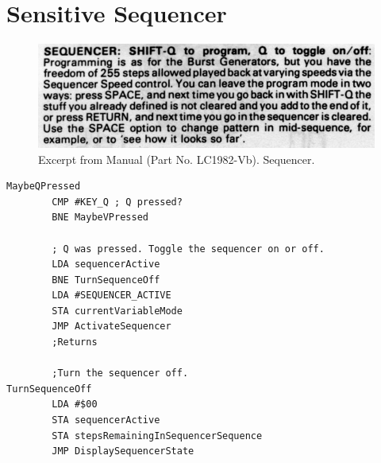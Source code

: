 \chapter{Sensitive Sequencer} 
\lstset{style=6502Style}

\begin{figure}[H]
    \centering
    \begin{adjustbox}{width=10.5cm,margin=0cm}
      \includegraphics[width=12cm]{src/sequencer/sequencer.png}%
    \end{adjustbox}
    \caption{
      Excerpt from Manual (Part No. LC1982-Vb). Sequencer.
      }
\end{figure}

\begin{lstlisting}[caption=From \icode{CheckKeyboardInput}.]
MaybeQPressed    
        CMP #KEY_Q ; Q pressed?
        BNE MaybeVPressed

        ; Q was pressed. Toggle the sequencer on or off.
        LDA sequencerActive
        BNE TurnSequenceOff
        LDA #SEQUENCER_ACTIVE
        STA currentVariableMode
        JMP ActivateSequencer
        ;Returns

        ;Turn the sequencer off.
TurnSequenceOff   
        LDA #$00
        STA sequencerActive
        STA stepsRemainingInSequencerSequence
        JMP DisplaySequencerState
\end{lstlisting}

